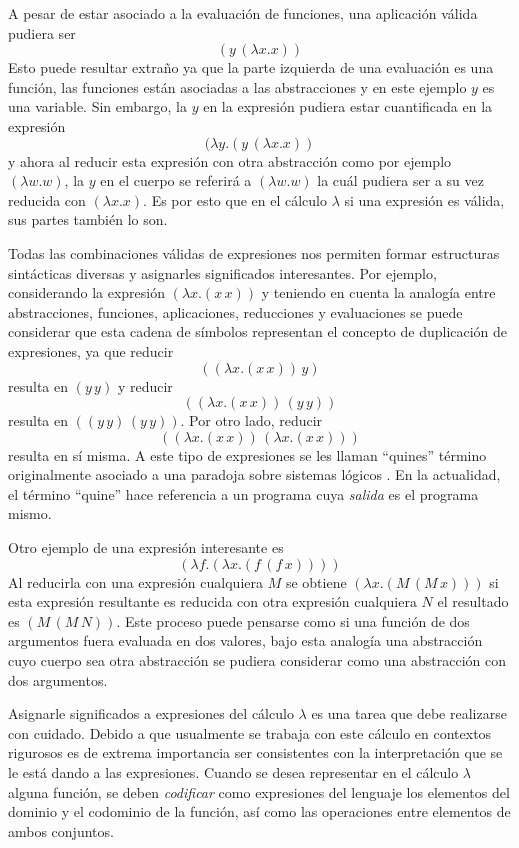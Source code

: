 A pesar de estar asociado a la evaluación de funciones, una aplicación válida pudiera ser
\[ (y\, (λx.x)) \]
Esto puede resultar extraño ya que la parte izquierda de una evaluación es una función, las funciones están asociadas a las abstracciones y en este ejemplo $ y $ es una variable. Sin embargo, la $ y $ en la expresión pudiera estar cuantificada en la expresión
\[ (λy.(y\, (λx.x)) \]
y ahora al reducir esta expresión con otra abstracción como por ejemplo $ (λw.w) $, la $ y $ en el cuerpo se referirá a $ (λw.w) $ la cuál pudiera ser a su vez reducida con $ (λx.x) $. Es por esto que en el cálculo $ λ $ si una expresión es válida, sus partes también lo son.

Todas las combinaciones válidas de expresiones nos permiten formar estructuras sintácticas diversas y asignarles significados interesantes. Por ejemplo, considerando la expresión $ (λx.(x\, x)) $ y teniendo en cuenta la analogía entre abstracciones, funciones, aplicaciones, reducciones y evaluaciones se puede considerar que esta cadena de símbolos representan el concepto de duplicación de expresiones, ya que reducir
\[ ((λx.(x\, x))\, y) \]
resulta en $ (y\, y) $ y reducir
\[ ((λx.(x\, x))\, (y\, y)) \]
resulta en $ ((y\, y)\, (y\, y)) $. Por otro lado, reducir
\[ ((λx.(x\, x))\, (λx.(x\, x))) \]
resulta en sí misma. A este tipo de expresiones se les llaman ``quines'' \cite[pp.~431--437]{Hofstadter:GEB} término originalmente asociado a una paradoja sobre sistemas lógicos \cite{Quine:Paradox}. En la actualidad, el término ``quine'' hace referencia a un programa cuya \emph{salida} es el programa mismo.

Otro ejemplo de una expresión interesante es
\[ (λf.(λx.(f\, (f\, x)))) \]
Al reducirla con una expresión cualquiera $ M $ se obtiene $ (λx.(M\, (M\, x))) $ si esta expresión resultante es reducida con otra expresión cualquiera $ N $ el resultado es $ (M\, (M\, N)) $. Este proceso puede pensarse como si una función de dos argumentos fuera evaluada en dos valores, bajo esta analogía una abstracción cuyo cuerpo sea otra abstracción se pudiera considerar como una abstracción con dos argumentos.

Asignarle significados a expresiones del cálculo $ λ $ es una tarea que debe realizarse con cuidado. Debido a que usualmente se trabaja con este cálculo en contextos rigurosos es de extrema importancia ser consistentes con la interpretación que se le está dando a las expresiones. Cuando se desea representar en el cálculo $ λ $ alguna función, se deben \emph{codificar} como expresiones del lenguaje los elementos del dominio y el codominio de la función, así como las operaciones entre elementos de ambos conjuntos.

